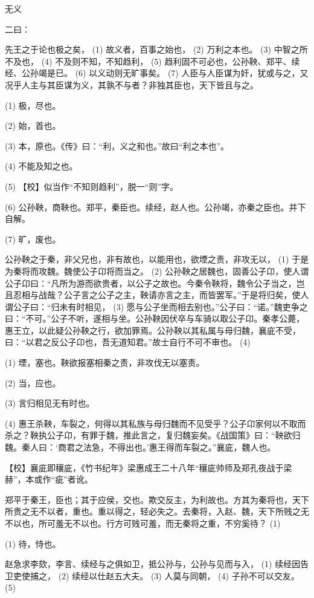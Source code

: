 \documentclass[12pt,UTF8]{ctexbook}
\begin{document}
无义


二曰：

先王之于论也极之矣， (1) 故义者，百事之始也， (2) 万利之本也。 (3) 中智之所不及也， (4) 不及则不知，不知趋利， (5) 趋利固不可必也，公孙鞅、郑平、续经、公孙竭是已。 (6) 以义动则无旷事矣。 (7) 人臣与人臣谋为奸，犹或与之，又况乎人主与其臣谋为义，其孰不与者？非独其臣也，天下皆且与之。

(1) 极，尽也。

(2) 始，首也。

(3) 本，原也。《传》曰：“利，义之和也。”故曰“利之本也”。

(4) 不能及知之也。

(5) 【校】似当作“不知则趋利”，脱一“则”字。

(6) 公孙鞅，商鞅也。郑平，秦臣也。续经，赵人也。公孙竭，亦秦之臣也。并下自解。

(7) 旷，废也。

公孙鞅之于秦，非父兄也，非有故也，以能用也，欲堙之责，非攻无以， (1) 于是为秦将而攻魏。魏使公子卬将而当之。 (2) 公孙鞅之居魏也，固善公子卬，使人谓公子卬曰：“凡所为游而欲贵者，以公子之故也。今秦令鞅将，魏令公子当之，岂且忍相与战哉？公子言之公子之主，鞅请亦言之主，而皆罢军。”于是将归矣，使人谓公子曰：“归未有时相见， (3) 愿与公子坐而相去别也。”公子曰：“诺。”魏吏争之曰：“不可。”公子不听，遂相与坐。公孙鞅因伏卒与车骑以取公子卬。秦孝公薨，惠王立，以此疑公孙鞅之行，欲加罪焉。公孙鞅以其私属与母归魏，襄庛不受，曰：“以君之反公子卬也，吾无道知君。”故士自行不可不审也。 (4)

(1) 堙，塞也。鞅欲报塞相秦之责，非攻伐无以塞责。

(2) 当，应也。

(3) 言归相见无有时也。

(4) 惠王杀鞅，车裂之，何得以其私族与母归魏而不见受乎？公子卬家何以不取而杀之？鞅执公子卬，有罪于魏，推此言之，复归魏妄矣。《战国策》曰：“鞅欲归魏。秦人曰：‘商君之法急，不得出也。’惠王得而车裂之。”襄庛，魏人也。

【校】襄庛即穰庛，《竹书纪年》梁惠成王二十八年“穰庛帅师及郑孔夜战于梁赫”，本或作“疵”者讹。

郑平于秦王，臣也；其于应侯，交也。欺交反主，为利故也。方其为秦将也，天下所贵之无不以者，重也。重以得之，轻必失之。去秦将，入赵、魏，天下所贱之无不以也，所可羞无不以也。行方可贱可羞，而无秦将之重，不穷奚待？ (1)

(1) 待，恃也。

赵急求李欬，李言、续经与之俱如卫，抵公孙与，公孙与见而与入， (1) 续经因告卫吏使捕之， (2) 续经以仕赵五大夫。 (3) 人莫与同朝， (4) 子孙不可以交友。 (5)
\end{document}
